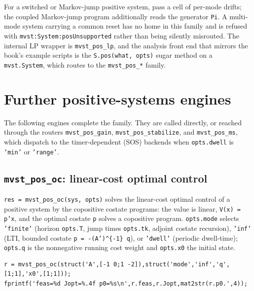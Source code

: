 \documentclass[11pt,oneside]{report}
\newcommand{\code}[1]{\texttt{#1}}
\begin{document}
For a switched or Markov-jump positive system, pass a cell of per-mode drifts;
the coupled Markov-jump program additionally reads the generator \code{Pi}. A
multi-mode system carrying a common reset has no home in this family and is
refused with \code{mvst:System:posUnsupported} rather than being silently misrouted.
The internal LP wrapper is \code{mvst\_pos\_lp}, and the analysis front end that
mirrors the book's example scripts is the \code{S.pos(what, opts)} sugar method on a
\code{mvst.System}, which routes to the \code{mvst\_pos\_*} family.

\hypertarget{further-positive-systems-engines}{%
\section{Further positive-systems engines}\label{further-positive-systems-engines}}

The following engines complete the family. They are called directly, or reached
through the routers \code{mvst\_pos\_gain}, \code{mvst\_pos\_stabilize}, and \code{mvst\_pos\_ms},
which dispatch to the timer-dependent (SOS) backends when \code{opts.dwell} is
\code{'min'} or \code{'range'}.

\hypertarget{mvst_pos_oc-linear-cost-optimal-control}{%
\subsection{\texorpdfstring{\code{mvst\_pos\_oc}: linear-cost optimal control}{mvst\_pos\_oc: linear-cost optimal control}}\label{mvst_pos_oc-linear-cost-optimal-control}}

\code{res = mvst\_pos\_oc(sys, opts)} solves the linear-cost optimal control of a
positive system by the copositive costate programs: the value is linear,
\code{V(x) = p'x}, and the optimal costate \code{p} solves a copositive program.
\code{opts.mode} selects \code{'finite'} (horizon \code{opts.T}, jump times \code{opts.tk}, adjoint
costate recursion), \code{'inf'} (LTI, bounded costate \code{p = -(A')\^{}\{-1\} q}), or
\code{'dwell'} (periodic dwell-time); \code{opts.q} is the nonnegative running cost
weight and \code{opts.x0} the initial state.

\begin{lstlisting}[style=matlabstyle]
r = mvst_pos_oc(struct('A',[-1 0;1 -2]),struct('mode','inf','q',[1;1],'x0',[1;1]));
fprintf('feas=%d Jopt=%.4f p0=%s\n',r.feas,r.Jopt,mat2str(r.p0.',4));
\end{lstlisting}
\end{document}

